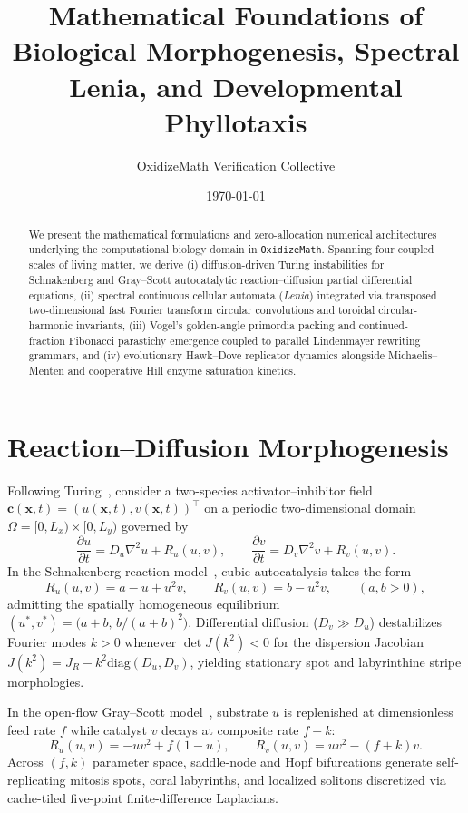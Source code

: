 \documentclass[12pt]{article}
\title{Mathematical Foundations of Biological Morphogenesis, Spectral Lenia, and Developmental Phyllotaxis}
\author{OxidizeMath Verification Collective}
\date{\today}
\begin{document}
\maketitle

\begin{abstract}
We present the mathematical formulations and zero-allocation numerical architectures underlying the computational biology domain in \texttt{OxidizeMath}. Spanning four coupled scales of living matter, we derive (i) diffusion-driven Turing instabilities for Schnakenberg and Gray--Scott autocatalytic reaction--diffusion partial differential equations, (ii) spectral continuous cellular automata (\emph{Lenia}) integrated via transposed two-dimensional fast Fourier transform circular convolutions and toroidal circular-harmonic invariants, (iii) Vogel's golden-angle primordia packing and continued-fraction Fibonacci parastichy emergence coupled to parallel Lindenmayer rewriting grammars, and (iv) evolutionary Hawk--Dove replicator dynamics alongside Michaelis--Menten and cooperative Hill enzyme saturation kinetics.
\end{abstract}

\section{Reaction--Diffusion Morphogenesis}

Following Turing~\cite{turing1952chemical}, consider a two-species activator--inhibitor field $\mathbf{c}(\mathbf{x}, t) = (u(\mathbf{x}, t), v(\mathbf{x}, t))^\top$ on a periodic two-dimensional domain $\Omega = [0, L_x) \times [0, L_y)$ governed by
\begin{equation}
\frac{\partial u}{\partial t} = D_u \nabla^2 u + R_u(u, v), \qquad
\frac{\partial v}{\partial t} = D_v \nabla^2 v + R_v(u, v).
\end{equation}
In the Schnakenberg reaction model~\cite{schnakenberg1979simple}, cubic autocatalysis takes the form
\begin{equation}
R_u(u, v) = a - u + u^2 v, \qquad R_v(u, v) = b - u^2 v, \qquad (a, b > 0),
\end{equation}
admitting the spatially homogeneous equilibrium $(u^*, v^*) = \bigl(a + b,\, b / (a + b)^2\bigr)$. Differential diffusion ($D_v \gg D_u$) destabilizes Fourier modes $k > 0$ whenever $\det J(k^2) < 0$ for the dispersion Jacobian $J(k^2) = J_R - k^2 \mathrm{diag}(D_u, D_v)$, yielding stationary spot and labyrinthine stripe morphologies.

In the open-flow Gray--Scott model~\cite{gray1984autocatalytic}, substrate $u$ is replenished at dimensionless feed rate $f$ while catalyst $v$ decays at composite rate $f + k$:
\begin{equation}
R_u(u, v) = -u v^2 + f(1 - u), \qquad R_v(u, v) = u v^2 - (f + k)v.
\end{equation}
Across $(f, k)$ parameter space, saddle-node and Hopf bifurcations generate self-replicating mitosis spots, coral labyrinths, and localized solitons discretized via cache-tiled five-point finite-difference Laplacians.
\end{document}
